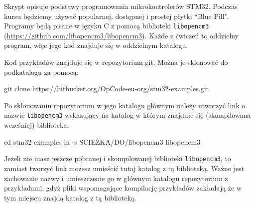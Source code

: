 % 
% 
% 
% 

Skrypt opisuje podstawy programowania mikrokontrolerów STM32. Podczas kursu będziemy używać
popularnej, dostępnej i prostej płytki ``Blue Pill''. Programy będą pisane w języku
C z pomocą biblioteki \Verb$libopencm3$ (\url{https://github.com/libopencm3/libopencm3}).
Każde z ćwiczeń to oddzielny program, więc jego kod znajduje się w oddzielnym katalogu.

Kod przykładów znajduje się w repozytorium git. Można je sklonować do podkatalogu za pomocą:

\begin{CodeFrame*}[bash]{}
  git clone https://bitbucket.org/OpCode-eu-org/stm32-examples.git
\end{CodeFrame*}

Po sklonowaniu repozytorium w jego katalogu głównym należy utworzyć link o nazwie \Verb$libopencm3$ wskazujący na katalog w którym znajduje się (skompilowana wcześniej) biblioteka:

\begin{CodeFrame*}[bash]{}
  cd stm32-examples
  ln -s SCIEŻKA/DO/libopencm3 libopencm3
\end{CodeFrame*}

Jeżeli nie masz jeszcze pobranej i skompilowanej biblioteki \Verb$libopencm3$, to zamiast tworzyć link możesz umieścić tutaj katalog z tą biblioteką.
Ważne jest zachowanie nazwy i umieszczenie go w głównym katalogu repozytorium z przykładami, gdyż pliki wspomagające kompilację przykładów zakładają że w tym miejscu znajdą katalog z tą biblioteką.

